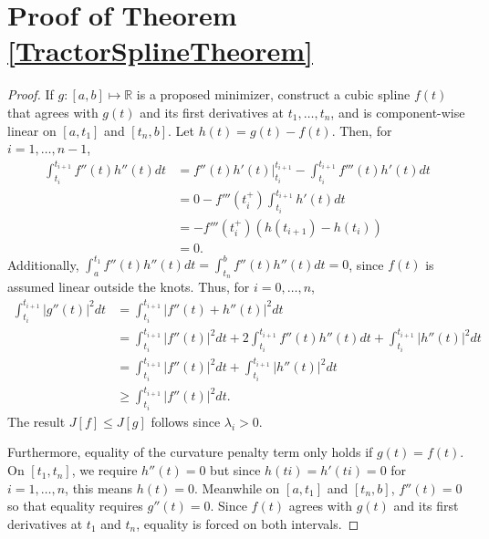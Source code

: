 \section{Proof of Theorem \ref{TractorSplineTheorem}}\label{AppendixTractorSplineProof}

\begin{proof}
If $g:[a,b]\mapsto \mathbb{R}$ is a proposed minimizer, construct a cubic spline $f(t)$ that agrees with $g(t)$ and its first derivatives at $t_1,\ldots,t_n$, and is component-wise linear on $[a, t_1]$ and $[t_n, b]$. Let $h(t) = g(t)-f(t)$. Then, for $i = 1,\dots ,n-1$, 
\begin{align*}
\int_{t_i}^{t_{i+1}}f''(t)h''(t)dt &=f''(t)h'(t) \bigg\rvert_{t_i}^{t_{i+1}}-\int_{t_i}^{t_{i+1}}f'''(t)h'(t)dt \\
&= 0-f'''(t_i^+)\int_{t_i}^{t_{i+1}}h'(t)dt \\
&= -f'''(t_i^+)\left( h(t_{i+1}) -h(t_i) \right)\\
&=0.
\end{align*}
Additionally, $\int_{a}^{t_1}f''(t)h''(t)dt=\int_{t_n}^{b}f''(t)h''(t)dt=0$, since $f(t)$ is assumed linear outside the knots. Thus, for $i=0,\ldots,n$, 
\begin{align*}
\int_{t_i}^{t_{i+1}}\lvert g''(t) \rvert^2dt &= \int_{t_i}^{t_{i+1}}\lvert f''(t)+h''(t)\rvert^2 dt\\
&= \int_{t_i}^{t_{i+1}}\lvert f''(t)\rvert^2dt+2\int_{t_i}^{t_{i+1}}f''(t)h''(t)dt+\int_{t_i}^{t_{i+1}}\lvert h''(t)\rvert^2dt\\
&=\int_{t_i}^{t_{i+1}}\lvert f''(t)\rvert^2dt+\int_{t_i}^{t_{i+1}}\lvert h''(t)\rvert^2dt\\
&\geq \int_{t_i}^{t_{i+1}}\lvert f''(t)\rvert^2dt.
\end{align*}
The result $J[f]\leq J[g]$ follows since $\lambda_i>0$. 

Furthermore, equality of the curvature penalty term only holds if $g(t) = f(t)$. On $[t_1, t_n]$, we require $h''(t) = 0$ but since $h(ti) = h'(ti) = 0$ for $i = 1, \ldots , n$, this means $h(t) = 0$. Meanwhile on $[a, t_1]$ and $[t_n, b]$, $f''(t) = 0$ so that equality requires $g''(t)=0$. Since $f(t)$ agrees with $g(t)$ and its first derivatives at $t_1$ and $t_n$, equality is forced on both intervals.
\end{proof}

